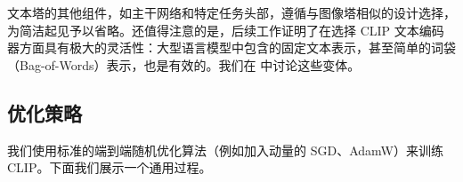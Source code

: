 \documentclass[../../book-main_zh.tex]{subfiles}
\begin{document}
文本塔的其他组件，如主干网络和特定任务头部，遵循与图像塔相似的设计选择，为简洁起见予以省略。还值得注意的是，后续工作证明了在选择 CLIP 文本编码器方面具有极大的灵活性：大型语言模型中包含的固定文本表示，甚至简单的词袋（Bag-of-Words）表示，也是有效的。我们在  中讨论这些变体。




\subsection{优化策略}
我们使用标准的端到端随机优化算法（例如加入动量的 SGD、AdamW）来训练 CLIP。下面我们展示一个通用过程。
\end{document}
